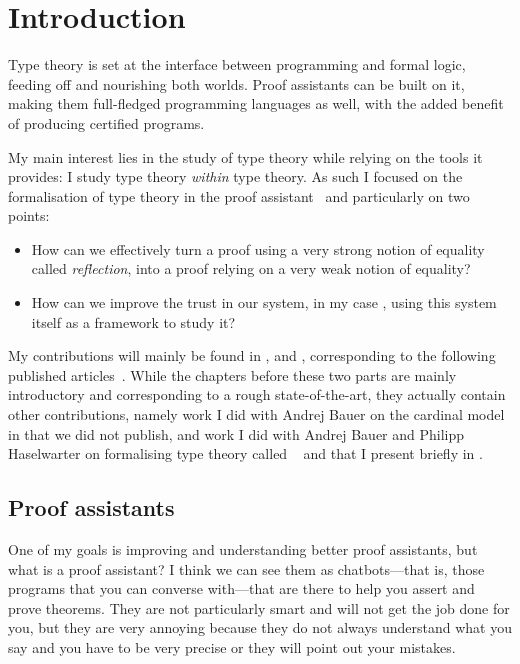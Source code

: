 \chapter{Introduction}

Type theory is set at the interface between programming and formal logic,
feeding off and nourishing both worlds. Proof assistants can be built on it,
making them full-fledged programming languages as well, with the added benefit
of producing certified programs.

My main interest lies in the study of type theory while relying on the tools it
provides: I study type theory \emph{within} type theory.
As such I focused on the formalisation of type theory in the \Coq proof
assistant~ and particularly on two points:
\begin{itemize}
  \item How can we effectively turn a proof using a very strong notion of
  equality called \emph{reflection}, into a proof relying on a very weak notion
  of equality?
  \item How can we improve the trust in our system, in my case \Coq, using this
  system itself as a framework to study it?
\end{itemize}

My contributions will mainly be found in , and
, corresponding to the following published
articles~.
While the chapters before these two parts are mainly introductory and
corresponding to a rough state-of-the-art, they actually contain other
contributions, namely work I did with Andrej Bauer on the cardinal model
in  that we did not publish, and work I did with Andrej Bauer
and Philipp Haselwarter on formalising type theory called
\ftt~ and that I present briefly in
.

\section{Proof assistants}

One of my goals is improving and understanding better proof assistants, but what
is a proof assistant?
I think we can see them as chatbots---that is, those programs that you can
converse with---that are there to help you assert and prove theorems.
They are not particularly smart and will not get the job done for you, but they
are very annoying because they do not always understand what you say and you
have to be very precise or they will point out your mistakes.

